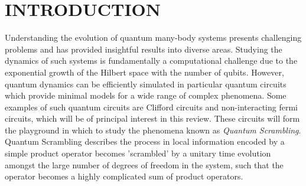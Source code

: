 \section{INTRODUCTION}
Understanding the evolution of quantum many-body systems presents challenging problems and has provided insightful results into diverse areas.
Studying the dynamics of such systems is fundamentally a computational challenge due to the exponential growth of the Hilbert space with 
the number of qubits. However, quantum dynamics can be efficiently simulated in particular quantum circuits which
provide minimal models for a wide range of complex phenomena. Some examples of such quantum circuits are 
Clifford circuits and non-interacting fermi circuits, which will be of principal interest in this review. These 
circuits will form the playground in which to study the phenomena known as \textit{Quantum Scrambling}.
Quantum Scrambling describes the process in local information encoded by a simple product operator becomes 'scrambled' by a 
unitary time evolution amongst the large number of degrees of freedom in the system, such that the operator becomes a highly complicated sum 
of product operators. 
